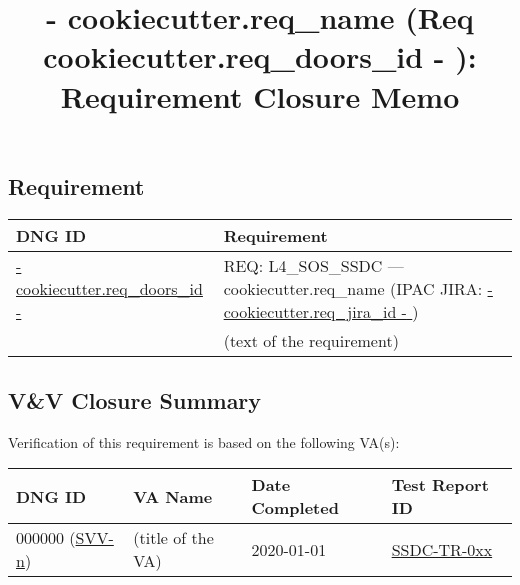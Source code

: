 \documentclass[TR]{spherex}
\title{ {{- cookiecutter.req_name }} (Req {{ cookiecutter.req_doors_id -}} ): Requirement Closure Memo}
\providecommand{\DOORSReqLink}[1]{\href{https://cae-tracetree-spherex.jpl.nasa.gov/vi#1.html}{#1}}
\providecommand{\IPACJiraLink}[1]{\href{https://jira.ipac.caltech.edu/browse/#1}{#1}}
\providecommand{\SSDCDocsLink}[1]{\href{https://spherex-docs.ipac.caltech.edu/#1}{#1}}
\begin{document}
\maketitlecompact


\begin{small}

\subsection*{Requirement}

\begin{longtable}{|l|p{}|}
\hline
\textbf{DNG ID} & \textbf{Requirement} \\
\endhead
\hline
\DOORSReqLink{ {{- cookiecutter.req_doors_id -}} } & REQ: L4\_SOS\_SSDC --- {{ cookiecutter.req_name }} (IPAC JIRA: \IPACJiraLink{ {{- cookiecutter.req_jira_id -}} }) \\
 & (text of the requirement) \\
\hline
\end{longtable}


\subsection*{V\&V Closure Summary}

Verification of this requirement is based on the following VA(s):

\begin{longtable}{|l|l|l|l|}
\hline
\textbf{DNG ID} & \textbf{VA Name} & \textbf{Date Completed} & \textbf{Test Report ID} \\
\endhead
\hline
000000 (\IPACJiraLink{SVV-n}) & (title of the VA) & 2020-01-01 & \SSDCDocsLink{SSDC-TR-0xx} \\
\hline
\end{longtable}



\end{small}
\end{document}
